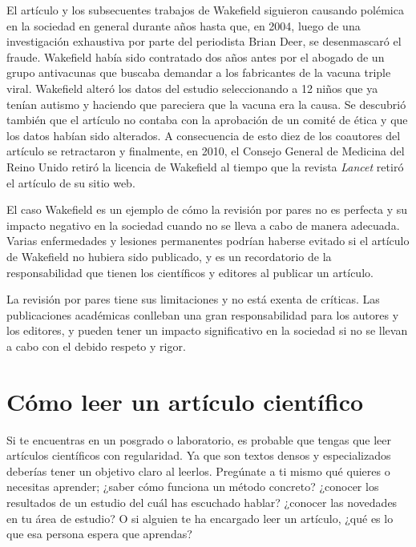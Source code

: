 El artículo y los subsecuentes trabajos de Wakefield siguieron causando polémica en la sociedad en general durante años hasta que, en 2004, luego de una investigación exhaustiva por parte del periodista Brian Deer, se desenmascaró el fraude\cite{Deerc1127}.
Wakefield había sido contratado dos años antes por el abogado de un grupo antivacunas que buscaba demandar a los fabricantes de la vacuna triple viral.
Wakefield alteró los datos del estudio seleccionando a 12 niños que ya tenían autismo y haciendo que pareciera que la vacuna era la causa.
Se descubrió también que el artículo no contaba con la aprobación de un comité de ética y que los datos habían sido alterados.
A consecuencia de esto diez de los coautores del artículo se retractaron y finalmente, en 2010, el Consejo General de Medicina del Reino Unido retiró la licencia de Wakefield al tiempo que la revista \emph{Lancet} retiró el artículo de su sitio web.

El caso Wakefield es un ejemplo de cómo la revisión por pares no es perfecta y su impacto negativo en la sociedad cuando no se lleva a cabo de manera adecuada.
Varias enfermedades y lesiones permanentes podrían haberse evitado si el artículo de Wakefield no hubiera sido publicado, y es un recordatorio de la responsabilidad que tienen los científicos y editores al publicar un artículo.

\begin{remember}
	La revisión por pares tiene sus limitaciones y no está exenta de críticas.
	Las publicaciones académicas conlleban una gran responsabilidad para los
	autores y los editores, y pueden tener un impacto significativo en la
	sociedad si no se llevan a cabo con el debido respeto y rigor.
\end{remember}

\section{Cómo leer un artículo científico}
\label{sec:comoleer}

Si te encuentras en un posgrado o laboratorio, es probable que tengas que leer artículos científicos con regularidad.
Ya que son textos densos y especializados deberías tener un objetivo claro al leerlos.
Pregúnate a ti mismo qué quieres o necesitas aprender; ¿saber cómo funciona un método concreto?
¿conocer los resultados de un estudio del cuál has escuchado hablar?
¿conocer las novedades en tu área de estudio?
O si alguien te ha encargado leer un artículo, ¿qué es lo que esa persona espera que aprendas?

